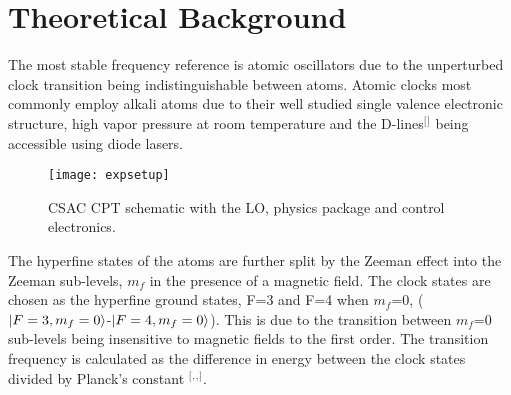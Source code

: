 \section{\label{sec:level1}Theoretical Background}
The most stable frequency reference is atomic oscillators due to the unperturbed clock transition being indistinguishable between atoms. Atomic clocks most commonly employ alkali atoms due to their well studied single valence electronic structure, high vapor pressure at room temperature and the D-lines$^[$\citep{Steck1998CesiumData}$^]$ being accessible using diode lasers. 
\begin{figure}[t]
\centering
\texttt{[image: expsetup]}
\caption{\label{fig:expsetup}CSAC CPT schematic with the LO, physics package and control electronics.}
\end{figure}
The hyperfine states of the atoms are further split by the Zeeman effect into the Zeeman sub-levels, $m_{f}$ in the presence of a magnetic field. The clock states are chosen as the hyperfine ground states, F=3 and F=4 when $m_{f}$=0, ($\lvert F=3,m_{f}=0\rangle$-$\lvert F=4,m_{f}=0\rangle$). This is due to the transition between $m_{f}$=0 sub-levels being insensitive to magnetic fields to the first order. The transition frequency is calculated as the difference in energy between the clock states divided by Planck's constant $^[$\citep{Knappe2007MEMSClocks}$^,$\citep{LombardiM.A.andHeavnerT.PandJefferts2007NISTSI}$^,$\citep{Sherlock2009HowSpectroscopy}$^]$.



